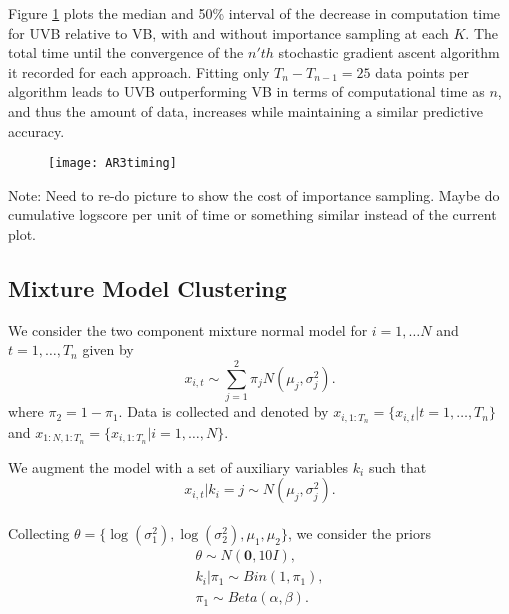\documentclass[12pt,a4paper]{article}\usepackage[]{graphicx}\usepackage[]{color}
\begin{document}
Figure \ref{fig:timing} plots the median and 50\% interval of the decrease in computation time for UVB relative to VB, with and without importance sampling at each $K$. The total time until the convergence of the $n'th$ stochastic gradient ascent algorithm it recorded for each approach. Fitting only $T_n - T_{n-1} = 25$ data points per algorithm leads to UVB outperforming VB in terms of computational time as $n$, and thus the amount of data, increases while maintaining a similar predictive accuracy.

\begin{figure}
\centering
\texttt{[image: AR3timing]}
\caption{}
\label{fig:timing}
\end{figure}

Note: Need to re-do picture to show the cost of importance sampling. Maybe do cumulative logscore per unit of time or something similar instead of the current plot.

\subsection{Mixture Model Clustering}

We consider the two component mixture normal model for $i = 1, \dots N$ and $t = 1, \dots, T_n$ given by
\begin{equation}
\label{mixNormalDGP1}
x_{i, t} \sim \sum_{j=1}^2 \pi_{j} N(\mu_j, \sigma^2_{j}).
\end{equation}
where $\pi_2 = 1 - \pi_1$. Data is collected and denoted by $x_{i, 1:T_n} = \{x_{i, t} | t = 1, \dots, T_n\}$ and $x_{1:N, 1:T_n} = \{x_{i, 1:T_n} | i = 1, \dots, N \}$.

We augment the model with a set of auxiliary variables $k_i$ such that
\begin{equation}
\label{mixNormalDGP2}
x_{i, t} | k_i = j \sim  N(\mu_j, \sigma^2_{j}).
\end{equation}
\\

Collecting $\theta = \{\log(\sigma^2_1), \log(\sigma^2_2), \mu_1, \mu_2 \}$, we consider the priors
\begin{align}
\theta \sim N(\boldsymbol{0}, 10 I), \\
k_i | \pi_1 \sim Bin(1, \pi_1), \label{kPrior} \\
\pi_1 \sim Beta(\alpha, \beta). \label{piPrior}
\end{align}
\\
\end{document}
